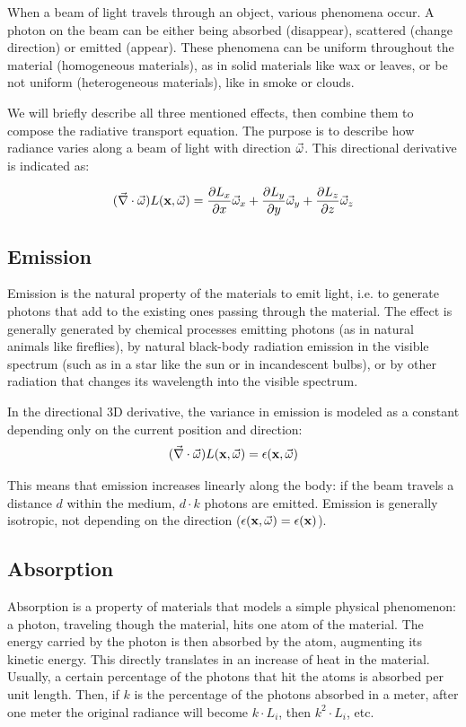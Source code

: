 When a beam of light travels through an object, various phenomena occur. A photon on the beam can be either being absorbed (disappear), scattered (change direction) or emitted (appear). These phenomena can be uniform throughout the material (homogeneous materials), as in solid materials like wax or leaves, or be not uniform (heterogeneous materials), like in smoke or clouds.

We will briefly describe all three mentioned effects, then combine them to compose the radiative transport equation. The purpose is to describe how radiance varies along a beam of light with direction $\vec{\omega}$. This directional derivative is indicated as:

$$
(\vec{\nabla} \cdot \vec{\omega}) L(\mathbf{x}, \vec{\omega}) = \frac{\partial L_x}{\partial x} \vec{\omega}_x + \frac{\partial L_y}{\partial y} \vec{\omega}_y +\frac{\partial L_z}{\partial z} \vec{\omega}_z
$$ 

\subsection{Emission}
Emission is the natural property of the materials to emit light, i.e. to generate photons that add to the existing ones passing through the material. The effect is generally generated by chemical processes emitting photons (as in natural animals like fireflies), by natural black-body radiation emission in the visible spectrum (such as in a star like the sun or in incandescent bulbs), or by other radiation that changes its wavelength into the visible spectrum.

In the directional 3D derivative, the variance in emission is modeled as a constant depending only on the current position and direction:
$$
(\vec{\nabla} \cdot \vec{\omega}) L(\mathbf{x}, \vec{\omega}) = \epsilon(\mathbf{x}, \vec{\omega})
$$

This means that emission increases linearly along the body: if the beam travels a distance $d$ within the medium, $d \cdot k$ photons are emitted. Emission is generally isotropic, not depending on the direction ($ \epsilon(\mathbf{x}, \vec{\omega}) =  \epsilon(\mathbf{x})$).

\subsection{Absorption}
Absorption is a property of materials that models a simple physical phenomenon: a photon, traveling though the material, hits one atom of the material. The energy carried by the photon is then absorbed by the atom, augmenting its kinetic energy. This directly translates in an increase of heat in the material. Usually, a certain percentage of the photons that hit the atoms is absorbed per unit length. Then, if $k$ is the percentage of the photons absorbed in a meter, after one meter the original radiance will become $k \cdot L_i$, then $k^2 \cdot L_i$, etc.

